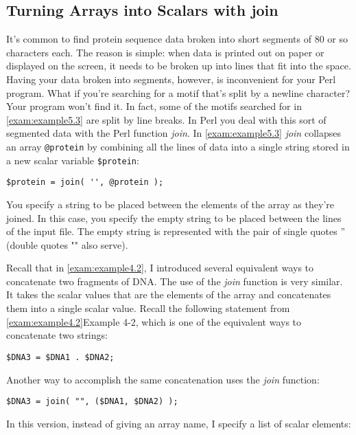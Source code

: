 \subsection{Turning Arrays into Scalars with join}
\label{sect:section5.3.2}
It's common to find protein sequence data broken into short segments of 80 or so characters each. The reason is simple: when data is printed out on paper or displayed on the screen, it needs to be broken up into lines that fit into the space. Having your data broken into segments, however, is inconvenient for your Perl program. What if you're searching for a motif that's split by a newline character? Your program won't find it.  In fact, some of the motifs searched for in \autoref{exam:example5.3} are split by line breaks. In Perl you deal with this sort of segmented data with the Perl function \textit{join}. In \autoref{exam:example5.3} \textit{join} collapses an array \verb|@protein| by combining all the lines of data into a single string stored in a new scalar variable \verb|$protein|:

\begin{lstlisting}
$protein = join( '', @protein );
\end{lstlisting}

You specify a string to be placed between the elements of the array as they're joined. In this case, you specify the empty string to be placed between the lines of the input file. The empty string is represented with the pair of single quotes '' (double quotes "" also serve).  

Recall that in \autoref{exam:example4.2}, I introduced several equivalent ways to concatenate two fragments of DNA. The use of the \textit{join} function is very similar. It takes the scalar values that are the elements of the array and concatenates them into a single scalar value. Recall the following statement from \autoref{exam:example4.2}Example 4-2, which is one of the equivalent ways to concatenate two strings: 

\begin{lstlisting}
$DNA3 = $DNA1 . $DNA2;
\end{lstlisting}

Another way to accomplish the same concatenation uses the \textit{join} function:

\begin{lstlisting}
$DNA3 = join( "", ($DNA1, $DNA2) );
\end{lstlisting}

In this version, instead of giving an array name, I specify a list of scalar elements:

